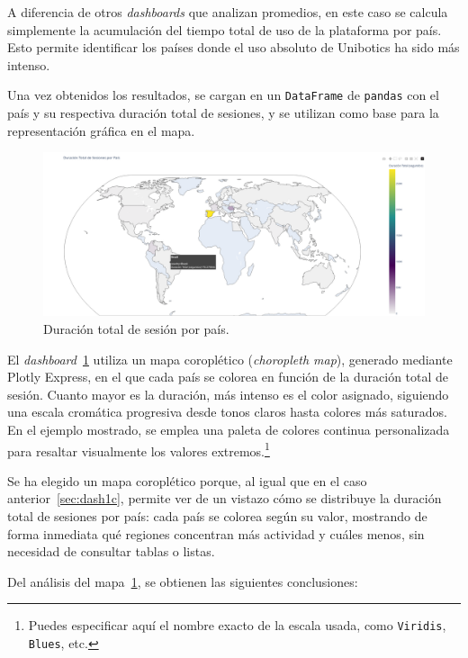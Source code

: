 \documentclass[a4paper, 12pt]{book}
\begin{document}
A diferencia de otros \textit{dashboards} que analizan promedios, en este caso se calcula simplemente la acumulación del tiempo total de uso de la plataforma por país. Esto permite identificar los países donde el uso absoluto de Unibotics ha sido más intenso.

Una vez obtenidos los resultados, se cargan en un \texttt{DataFrame} de \texttt{pandas} con el país y su respectiva duración total de sesiones, y se utilizan como base para la representación gráfica en el mapa.

\begin{figure}[H]
  \centering
  \includegraphics[width=1.1\textwidth]{img/2a.png}
  \caption{Duración total de sesión por país.}
  \label{fig:2a}
\end{figure}

El \textit{dashboard}~\ref{fig:2a} utiliza un mapa coroplético (\textit{choropleth map}), generado mediante Plotly Express, en el que cada país se colorea en función de la duración total de sesión. Cuanto mayor es la duración, más intenso es el color asignado, siguiendo una escala cromática progresiva desde tonos claros hasta colores más saturados. En el ejemplo mostrado, se emplea una paleta de colores continua personalizada para resaltar visualmente los valores extremos.\footnote{Puedes especificar aquí el nombre exacto de la escala usada, como \texttt{Viridis}, \texttt{Blues}, etc.}

Se ha elegido un mapa coroplético porque, al igual que en el caso anterior~\ref{sec:dash1c}, permite ver de un vistazo cómo se distribuye la duración total de sesiones por país: cada país se colorea según su valor, mostrando de forma inmediata qué regiones concentran más actividad y cuáles menos, sin necesidad de consultar tablas o listas.

Del análisis del mapa~\ref{fig:2a}, se obtienen las siguientes conclusiones:
\end{document}
